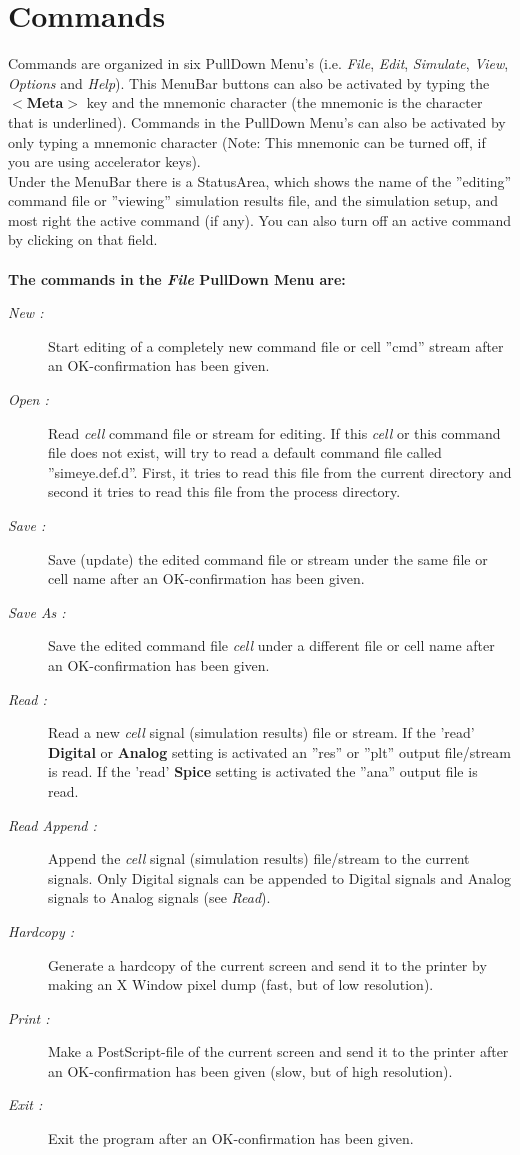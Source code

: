 \section{Commands}
Commands are organized in six PullDown Menu's (i.e. {\it File},
{\it Edit}, {\it Simulate}, {\it View}, {\it Options} and {\it Help}).
This MenuBar buttons can also be activated by typing the $<${\bf Meta}$>$ key
and the mnemonic character (the mnemonic
is the character that is underlined).
Commands in the PullDown Menu's can also be activated by only typing
a mnemonic character (Note: This mnemonic can be turned off,
if you are using accelerator keys).
\\
Under the MenuBar there is a StatusArea,
which shows the name
of the ''editing'' command file or ''viewing'' simulation results file,
and the simulation setup, and most right the active command (if any).
You can also turn off an active command by clicking on that field.\\
\\
{\bf The commands in the {\it File} PullDown Menu are:}
\begin{description}
\item [{\it New :}]
Start editing of a completely new command file or cell ''cmd'' stream
after an OK-confirmation has been given.
\item [{\it Open :}]
Read {\it cell} command file or stream for editing.
If this {\it cell} or this command file does not exist,
will try to read a default command file called ''simeye.def.d''.
First, it tries to read this file from the current directory
and second it tries to read this file from the process directory.
\item [{\it Save :}]
Save (update) the edited command file or stream under the same file
or cell name after an OK-confirmation has been given.
\item [{\it Save As :}]
Save the edited command file {\it cell} under a
different file or cell name after an OK-confirmation has been given.
\item [{\it Read :}]
Read a new {\it cell} signal (simulation results) file or stream.
If the 'read' {\bf Digital} or {\bf Analog} setting is activated
an  ''res'' or ''plt'' output file/stream is read.
If the 'read' {\bf Spice} setting is activated
the  ''ana'' output file is read.
\item [{\it Read Append :}]
Append the {\it cell} signal (simulation results) file/stream to the current
signals.
Only Digital signals can be appended to Digital signals
and Analog signals to Analog signals (see {\it Read}).
\item [{\it Hardcopy :}]
Generate a hardcopy of the current screen and send it to the printer
by making an X Window pixel dump (fast, but of low resolution).
\item [{\it Print :}]
Make a PostScript-file of the current screen and send it to the printer
after an OK-confirmation has been given (slow, but of high resolution).
\item [{\it Exit :}]
Exit the program after an OK-confirmation has been given.
\end{description}

